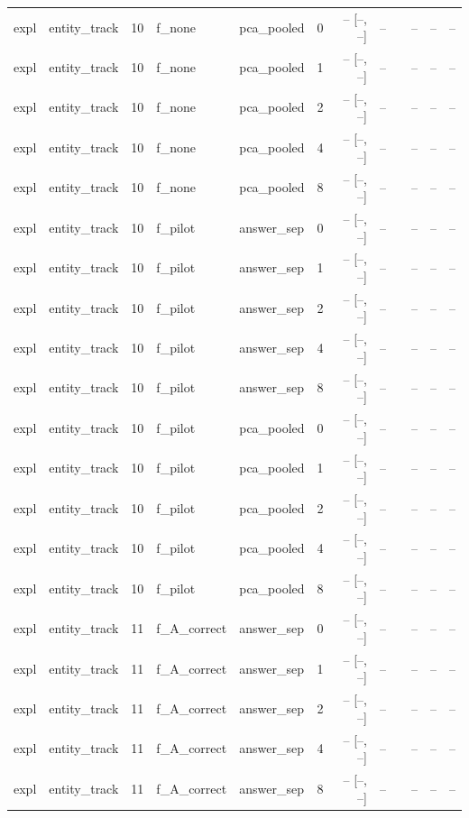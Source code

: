 \begin{tabular}{llrllrrrlrrr}
expl & entity\_track & 10 & f\_none & pca\_pooled & 0 & -- [--, --] & -- &  & -- & -- & -- \\
expl & entity\_track & 10 & f\_none & pca\_pooled & 1 & -- [--, --] & -- &  & -- & -- & -- \\
expl & entity\_track & 10 & f\_none & pca\_pooled & 2 & -- [--, --] & -- &  & -- & -- & -- \\
expl & entity\_track & 10 & f\_none & pca\_pooled & 4 & -- [--, --] & -- &  & -- & -- & -- \\
expl & entity\_track & 10 & f\_none & pca\_pooled & 8 & -- [--, --] & -- &  & -- & -- & -- \\
expl & entity\_track & 10 & f\_pilot & answer\_sep & 0 & -- [--, --] & -- &  & -- & -- & -- \\
expl & entity\_track & 10 & f\_pilot & answer\_sep & 1 & -- [--, --] & -- &  & -- & -- & -- \\
expl & entity\_track & 10 & f\_pilot & answer\_sep & 2 & -- [--, --] & -- &  & -- & -- & -- \\
expl & entity\_track & 10 & f\_pilot & answer\_sep & 4 & -- [--, --] & -- &  & -- & -- & -- \\
expl & entity\_track & 10 & f\_pilot & answer\_sep & 8 & -- [--, --] & -- &  & -- & -- & -- \\
expl & entity\_track & 10 & f\_pilot & pca\_pooled & 0 & -- [--, --] & -- &  & -- & -- & -- \\
expl & entity\_track & 10 & f\_pilot & pca\_pooled & 1 & -- [--, --] & -- &  & -- & -- & -- \\
expl & entity\_track & 10 & f\_pilot & pca\_pooled & 2 & -- [--, --] & -- &  & -- & -- & -- \\
expl & entity\_track & 10 & f\_pilot & pca\_pooled & 4 & -- [--, --] & -- &  & -- & -- & -- \\
expl & entity\_track & 10 & f\_pilot & pca\_pooled & 8 & -- [--, --] & -- &  & -- & -- & -- \\
expl & entity\_track & 11 & f\_A\_correct & answer\_sep & 0 & -- [--, --] & -- &  & -- & -- & -- \\
expl & entity\_track & 11 & f\_A\_correct & answer\_sep & 1 & -- [--, --] & -- &  & -- & -- & -- \\
expl & entity\_track & 11 & f\_A\_correct & answer\_sep & 2 & -- [--, --] & -- &  & -- & -- & -- \\
expl & entity\_track & 11 & f\_A\_correct & answer\_sep & 4 & -- [--, --] & -- &  & -- & -- & -- \\
expl & entity\_track & 11 & f\_A\_correct & answer\_sep & 8 & -- [--, --] & -- &  & -- & -- & -- \\

\end{tabular}
